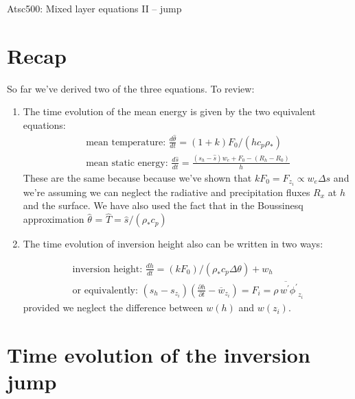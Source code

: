 \documentclass[12pt]{article}
\begin{document}
\pagestyle{first}

\begin{center}
Atsc500: Mixed layer equations II -- jump\\
\end{center}

\section{Recap}
\label{sec:recap}

So far we've derived two of the three equations.  To review:

\begin{enumerate}
\item The time evolution of the mean energy is given by the
two equivalent equations:
\begin{gather*}
  \text{mean temperature: } \frac{d \hat{\theta} }{dt} =(1 + k) F_0/(h c_p\rho_*)\\
\text{mean static energy: } \frac{d \hat{s}}{dt} = \frac{ (s_h - \hat{s} )w_e + F_0 - ( R_h  - R_0 )}{h}
\end{gather*}
These are the same because because we've shown that $k F_0 = F_{z_i} \propto w_e \Delta s$ and we're assuming
we can neglect the radiative and precipitation fluxes $R_x$ at $h$ and
the surface.  We have also used the fact that  in the Boussinesq approximation $\hat{\theta}$ =
$\hat{T} = \hat{s}/(\rho_* c_p)$


\item The time evolution of inversion height also can be written in two ways:

\begin{gather*}
\text{inversion height: } \frac{dh }{dt} = ( k F_0)/(\rho_* c_p \Delta \theta) + w_h \label{eq:hriseb}\\
\text{or equivalently: } (s_h - s_{z_i}) \left (\frac{\partial h }{\partial t}  - \overline{w}_{z_i} \right ) 
=  F_i =  \overline{\rho\, w^\prime \phi^\prime}_{z_i}
\end{gather*}
provided we neglect the difference between $w(h)$ and $w(z_i)$.



\end{enumerate}



\section{Time evolution of the inversion jump}
\label{sec:time-evol-invers}
\end{document}
